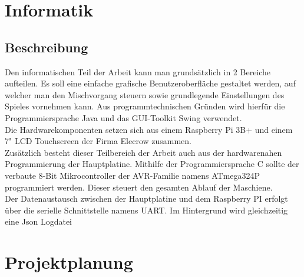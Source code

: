 \chapter{Informatik}
\label{sec:Informatik}
\section{Beschreibung}

Den informatischen Teil der Arbeit kann man grundsätzlich in 2 Bereiche aufteilen. Es soll eine einfache grafische Benutzeroberfläche gestaltet werden, auf welcher man den Mischvorgang steuern sowie grundlegende Einstellungen des Spieles vornehmen kann.
Aus programmtechnischen Gründen wird hierfür die Programmiersprache Java und das GUI-Toolkit Swing verwendet. \\
Die Hardwarekomponenten setzen sich aus einem Raspberry Pi 3B+ und einem 7" LCD Touchscreen der Firma Elecrow zusammen. \\

Zusätzlich besteht dieser Teilbereich der Arbeit auch aus der hardwarenahen Programmierung der Hauptplatine. Mithilfe der Programmiersprache C sollte der verbaute 8-Bit Mikrocontroller der AVR-Familie namens ATmega324P programmiert werden.
Dieser steuert den gesamten Ablauf der Maschiene. \\

Der Datenaustausch zwischen der Hauptplatine und dem Raspberry PI erfolgt über die serielle Schnittstelle namens UART.
Im Hintergrund wird gleichzeitig eine Json Logdatei
\chapter{Projektplanung}
\label{sec:Projektplanung}
